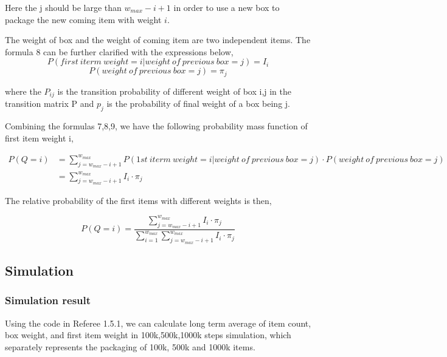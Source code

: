 \documentclass{article}
\begin{document}
Here the j should be large than $w_{max}-i+1$ in order to use a new box to package the new coming item with weight $i$.

The weight of box and the weight of coming item are two independent items. The formula 8 can be further clarified with the expressions below,
\begin{equation}
    P(first\ iterm\ weight=i|weight\ of\ previous\ box=j)=I_{i}
\end{equation}
\begin{equation}
    P(weight\ of\ previous\ box=j)=\pi_j
\end{equation}
    
where the $P_{ij}$ is the transition probability of different weight of box i,j in the transition matrix P and $p_j$ is the probability of final weight of a box being j.

Combining the formulas 7,8,9, we have the following probability mass function of first item weight i,

\begin{equation}
\begin{aligned}
P(Q=i)&=\sum_{j=w_{max}-i+1}^{w_{max}} P(1st\ iterm\ weight=i|weight\ of\ previous\ box=j)\cdot P(weight\ of\ previous\ box=j)\\
&=\sum_{j=w_{max}-i+1}^{w_{max}}I_{i}\cdot \pi_j
\end{aligned}
\end{equation}

The relative probability of the first items with different weights is then,

\begin{equation}
    P(Q=i)=\frac{\sum_{j=w_{max}-i+1}^{w_{max}}I_{i}\cdot \pi_j}{\sum_{i=1}^{w_{max}}\sum_{j=w_{max}-i+1}^{w_{max}}I_{i}\cdot \pi_j}
\end{equation}

\subsection{Simulation}
\subsubsection{Simulation result}
Using the code in Referee 1.5.1, we can calculate long term average of item count, box weight, and first item weight in 100k,500k,1000k steps simulation, which separately represents the packaging of 100k, 500k and 1000k items.
\end{document}
